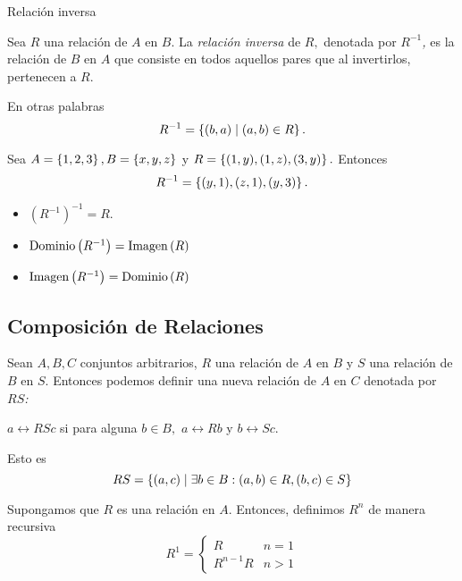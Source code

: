 	{Relación inversa}

	Sea $R$ una relación de $A$ en $B.$ La \emph{relación inversa} de $R,$ denotada por \emph{$R^{-1}$,} es la relación de $B$ en $A$ que consiste en todos aquellos pares que al invertirlos, pertenecen a $R.$

	En otras palabras
	$$
	R^{-1}=\left\{ (b,a)\mid (a,b)\in R \right\}.
	$$



	\begin{problema}
		Sea $A=\left\{ 1,2,3 \right\}, B=\left\{ x,y,z \right\}$ y $R=\left\{ (1,y),(1,z),(3,y) \right\}.$ Entonces
		$$
		R^{-1}=\left\{ (y,1), (z,1), (y,3) \right\}.
		$$
	\end{problema}



	\begin{observacion}
		\begin{itemize}
			\item $\left( R^{-1} \right)^{-1}=R.$
			\item $\operatorname{Dominio}\left( R^{-1} \right)=\operatorname{Imagen}\left( R \right)$
			\item $\operatorname{Imagen}\left( R^{-1} \right)=\operatorname{Dominio}\left( R \right)$
		\end{itemize}
	\end{observacion}




\subsection{Composición de Relaciones}

	Sean $A,B,C$ conjuntos arbitrarios, $R$ una relación de $A$ en $B$ y $S$ una relación de $B$ en $S.$  Entonces podemos definir una nueva relación de $A$ en $C$ denotada por \emph{$RS$:}
	\begin{center}
		$a\rel{{RS}}c$ si para alguna $b \in B,$ $a\rel{R}b$ y $b\rel{S}c.$
	\end{center}



	Esto es
	$$
	RS=\left\{ (a,c)\mid \exists b\in B: (a,b)\in R, (b,c)\in S \right\}
	$$



	Supongamos que $R$ es una relación en $A.$ Entonces, definimos $R^{n}$ de manera recursiva
	$$
	R^{1}=
	\begin{cases}
		R & n=1 \\
		R^{n-1}R & n>1
	\end{cases}
	$$








